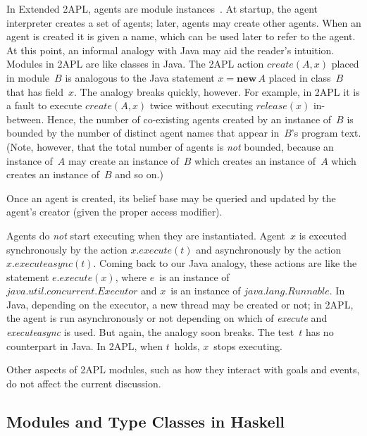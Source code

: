 \documentclass[conference,compsoc]{IEEEtran} %
\begin{document}
In Extended 2APL, agents are module
instances~\cite{DBLP:conf/prima/DastaniMS08}. At startup, the agent
interpreter creates a set of agents; later, agents may create other agents.
When an agent is created it is given a name, which can be used later to
refer to the agent. At this point, an informal analogy with Java may aid
the reader's intuition. Modules in 2APL are like classes in Java. The 2APL
action $\mathit{create}(A,x)$ placed in module~$B$ is analogous to the Java
statement $x=\mathbf{new}\,A$ placed in class~$B$ that has field~$x$.  The
analogy breaks quickly, however. For example, in 2APL it is a fault to
execute $\mathit{create}(A,x)$ twice without executing
$\mathit{release}(x)$ in-between. Hence, the number of co-existing agents
created by an instance of~$B$ is bounded by the number of distinct agent
names that appear in~$B$'s program text. (Note, however, that the total
number of agents is \emph{not} bounded, because an instance of~$A$ may
create an instance of~$B$ which creates an instance of~$A$ which creates an
instance of~$B$ and so on.)

Once an agent is created, its belief base may be queried and updated by the
agent's creator (given the proper access modifier).

Agents do \emph{not} start executing when they are instantiated. Agent~$x$
is executed synchronously by the action $x.\mathit{execute}(t)$ and
asynchronously by the action $x.\mathit{executeasync}(t)$. Coming back to
our Java analogy, these actions are like the statement
$e.\mathit{execute}(x)$, where $e$~is an instance of
$\mathit{java}.\mathit{util}.\mathit{concurrent}.\mathit{Executor}$ and
$x$~is an instance of $\mathit{java}.\mathit{lang}.\mathit{Runnable}$.  In
Java, depending on the executor, a new thread may be created or not; in
2APL, the agent is run asynchronously or not depending on which of
\textit{execute} and \textit{executeasync} is used. But again, the analogy
soon breaks. The test~$t$ has no counterpart in Java. In 2APL, when
$t$~holds, $x$~stops executing.

Other aspects of 2APL modules, such as how they interact with goals and
events, do not affect the current discussion.

\subsection{Modules and Type Classes in Haskell} %

\end{document}
